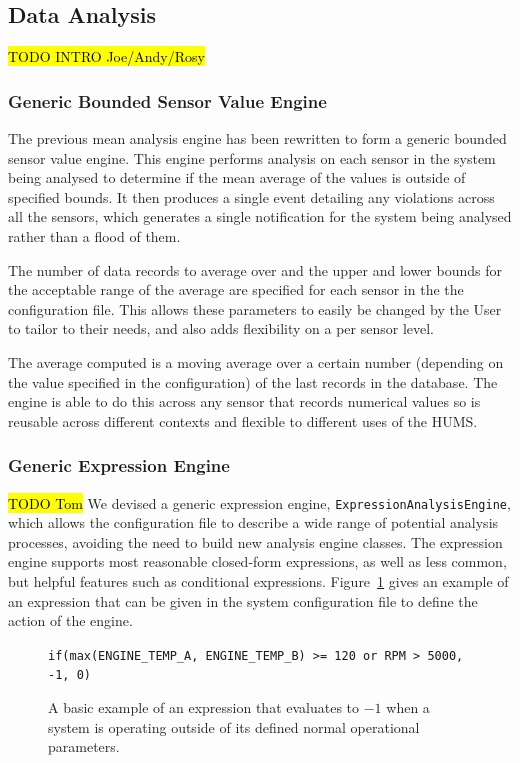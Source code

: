 \documentclass[10pt,a4paper]{article}
\begin{document}
\subsection{Data Analysis}
\label{sec:analysis}
\hl{TODO INTRO Joe/Andy/Rosy}

\subsubsection{Generic Bounded Sensor Value Engine}

The previous mean analysis engine has been rewritten to form a generic bounded sensor value engine. This engine performs analysis on each sensor in the system being analysed to determine if the mean average of the values is outside of specified bounds. It then produces a single event detailing any violations across all the sensors, which generates a single notification for the system being analysed rather than a flood of them.

The number of data records to average over and the upper and lower bounds for the acceptable range of the average are specified for each sensor in the the configuration file. This allows these parameters to easily be changed by the User to tailor to their needs, and also adds flexibility on a per sensor level.

The average computed is a moving average over a certain number (depending on the value specified in the configuration) of the last records in the database. The engine is able to do this across any sensor that records numerical values so is reusable across different contexts and flexible to different uses of the HUMS.


\subsubsection{Generic Expression Engine}
\hl{TODO Tom}
We devised a generic expression engine, \texttt{ExpressionAnalysisEngine}, which allows the configuration file to describe a wide range of potential analysis processes, avoiding the need to build new analysis engine classes. The expression engine supports most reasonable closed-form expressions, as well as less common, but helpful features such as conditional expressions. Figure~\ref{fig:exprExample} gives an example of an expression that can be given in the system configuration file to define the action of the engine.
\begin{figure}[tbp]
\centering
\verb+if(max(ENGINE_TEMP_A, ENGINE_TEMP_B) >= 120 or RPM > 5000, -1, 0)+
\caption{A basic example of an expression that evaluates to $-1$ when a system is operating outside of its defined normal operational parameters.}
\label{fig:exprExample}
\end{figure}
\end{document}
